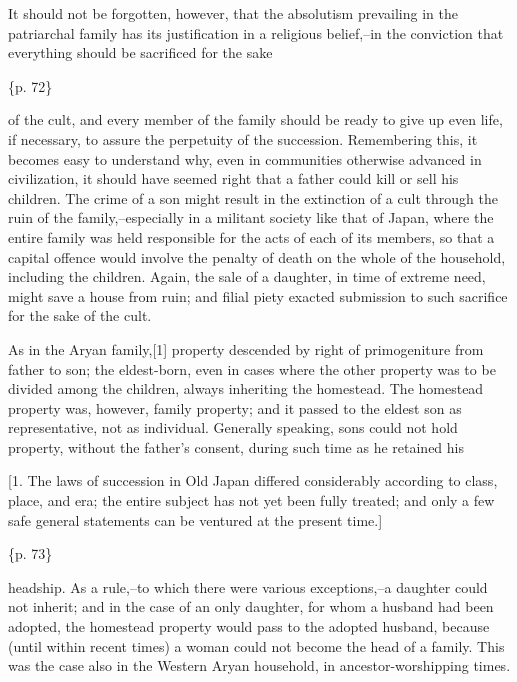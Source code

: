It should not be forgotten, however, that the absolutism prevailing in the patriarchal family has its justification in a religious belief,--in the conviction that everything should be sacrificed for the sake

\{p. 72\}

of the cult, and every member of the family should be ready to give up even life, if necessary, to assure the perpetuity of the succession. Remembering this, it becomes easy to understand why, even in communities otherwise advanced in civilization, it should have seemed right that a father could kill or sell his children. The crime of a son might result in the extinction of a cult through the ruin of the family,--especially in a militant society like that of Japan, where the entire family was held responsible for the acts of each of its members, so that a capital offence would involve the penalty of death on the whole of the household, including the children. Again, the sale of a daughter, in time of extreme need, might save a house from ruin; and filial piety exacted submission to such sacrifice for the sake of the cult.



As in the Aryan family,[1] property descended by right of primogeniture from father to son; the eldest-born, even in cases where the other property was to be divided among the children, always inheriting the homestead. The homestead property was, however, family property; and it passed to the eldest son as representative, not as individual. Generally speaking, sons could not hold property, without the father's consent, during such time as he retained his

[1. The laws of succession in Old Japan differed considerably according to class, place, and era; the entire subject has not yet been fully treated; and only a few safe general statements can be ventured at the present time.]

\{p. 73\}

headship. As a rule,--to which there were various exceptions,--a daughter could not inherit; and in the case of an only daughter, for whom a husband had been adopted, the homestead property would pass to the adopted husband, because (until within recent times) a woman could not become the head of a family. This was the case also in the Western Aryan household, in ancestor-worshipping times.

